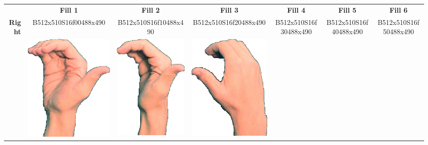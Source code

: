 \documentclass{article}
\begin{document}
\begin{center}
\begin{tabular}{r*{6}{c}}
&\textbf{Fill 1}&\textbf{Fill 2}&\textbf{Fill 3}&\textbf{Fill 4}&\textbf{Fill 5}&\textbf{Fill 6}\\
\multirow{2}{*}{\textbf{Right}}&
B512x510S16f00488x490&
B512x510S16f10488x490&
B512x510S16f20488x490&
B512x510S16f30488x490&
B512x510S16f40488x490&
B512x510S16f50488x490\\
&
\includegraphics[scale=0.1]{images/05-15-1.jpg}&
\includegraphics[scale=0.1]{images/05-15-2.jpg}&
\includegraphics[scale=0.1]{images/05-15-3.jpg}&

\end{tabular}
\end{center}
\end{document}
